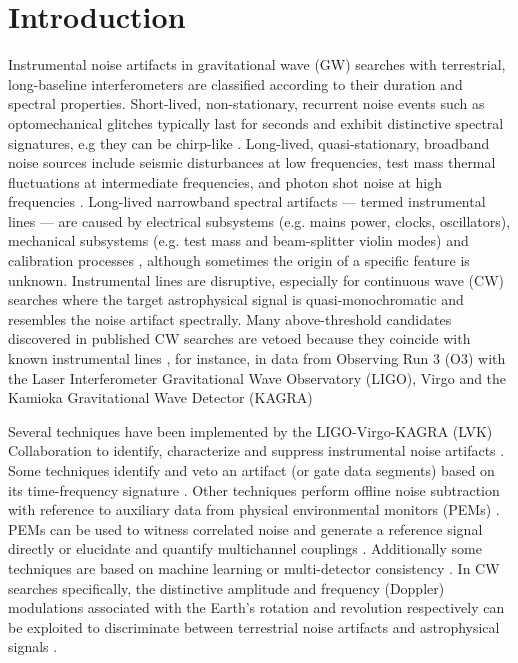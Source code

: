 \documentclass[pra,superscriptaddress,reprint,amsmath,amssymb,nofootinbib]{revtex4-2}
\begin{document}
\section{Introduction} \label{sec:intro}
Instrumental noise artifacts in gravitational wave (GW) searches with terrestrial, long-baseline interferometers \cite{Aasi2015,AcerneseEtAlAdVirgo:2015,Akutsu2021PTEP} are classified according to their duration and spectral properties.  Short-lived, non-stationary, recurrent noise events such as optomechanical glitches typically last for seconds and exhibit distinctive spectral signatures, e.g they can be chirp-like \cite{DetCharGW150914:2016,Davis2021,Davisgalaxies10010012,Glanzer2023}. Long-lived, quasi-stationary, broadband noise sources include seismic disturbances at low frequencies, test mass thermal fluctuations at intermediate frequencies, and photon shot noise at high frequencies \cite{AasiEtAlAdLIGO:2015,LIGOnoiseguide,2020Galax...8...82F,Nguyen2021}. Long-lived narrowband spectral artifacts --- termed instrumental lines --- are caused by electrical subsystems (e.g. mains power, clocks, oscillators), mechanical subsystems (e.g. test mass and beam-splitter violin modes) and calibration processes \cite{CovasEtAl:2018}, although sometimes the origin of a specific feature is unknown. Instrumental lines are disruptive, especially for continuous wave (CW) searches where the target astrophysical signal is quasi-monochromatic and resembles the noise artifact spectrally. Many above-threshold candidates discovered in published CW searches are vetoed because they coincide with known instrumental lines \cite{Piccinni2022,Riles2023,Wette2023}, for instance, in data from Observing Run 3 (O3) with the Laser Interferometer Gravitational Wave Observatory (LIGO), Virgo and the Kamioka Gravitational Wave Detector (KAGRA)  \cite[e.g.][]{Ligo_lineveto1,ligo_lineveto2,ligo_lineveto3} \newline 


Several techniques have been implemented by the LIGO-Virgo-KAGRA (LVK) Collaboration to identify, characterize and suppress instrumental noise artifacts \cite{Davis2021,Davisgalaxies10010012}. Some techniques identify and veto an artifact (or gate data segments) based on its time-frequency signature \cite{Abbott2018CQVeto,Steltner2022Ph}. Other techniques perform offline noise subtraction with reference to auxiliary data from physical environmental monitors (PEMs) \cite{Driggers2012RScI,Tiwari2015,Davis2019,Driggers2019}. PEMs can be used to witness correlated noise and generate a reference signal directly or elucidate and quantify multichannel couplings \cite{Jung2022PRD,marin1997}. Additionally some techniques are based on machine learning \cite{Cuoco2020,Vajente2020PhR,OrmistonEtAl:2020,Yamamoto2023} or multi-detector consistency \cite{KeitelEtAl:2014, 2015PhyS...90l5001L}. In CW searches specifically, the distinctive amplitude and frequency (Doppler) modulations associated with the Earth's rotation and revolution respectively can be exploited to discriminate between terrestrial noise artifacts and astrophysical signals \cite{Zhu2017PhRvD,JonesPhysRevD.106.123011}.  \newline 
\end{document}
